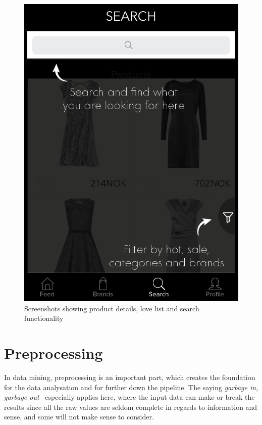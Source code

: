 \begin{figure}[H]
\begin{minipage}{.3\linewidth}
        \includegraphics[height=1.5\linewidth]{image/SoBazaarsearch.png}
    \end{minipage}
    \caption{Screenshots showing product details, love list and search
    functionality}
    \label{figure:SoBazaarfeed}
\end{figure}

\section{Preprocessing}
\label{sec:preprocessing}

In data mining, preprocessing is an important part, which creates the
foundation for the data analysation and for further down the pipeline.  The
saying \emph{garbage in, garbage out}~\cite{GIGO} especially applies here,
where the input data can make or break the results since all the raw values are
seldom complete in regards to information and sense, and some will not make
sense to consider. %

